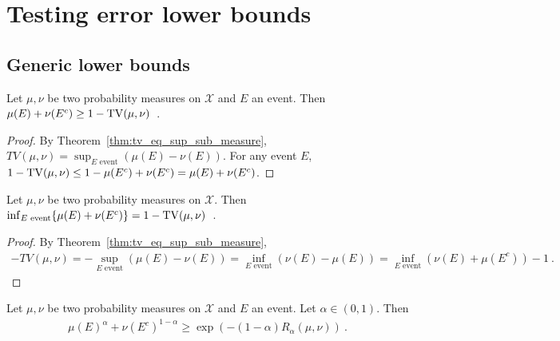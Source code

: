\chapter{Testing error lower bounds}

\section{Generic lower bounds}

\begin{lemma}
  \label{lem:testing_bound_tv}
  Let $\mu, \nu$ be two probability measures on $\mathcal X$ and $E$ an event. Then $\mu(E) + \nu(E^c) \ge 1 - \operatorname{TV}(\mu, \nu)$~.
\end{lemma}

\begin{proof}
By Theorem~\ref{thm:tv_eq_sup_sub_measure}, $TV(\mu, \nu) = \sup_{E \text{ event}} \left( \mu(E) - \nu(E) \right)$. For any event $E$, 
$1 - \operatorname{TV}(\mu, \nu) \le 1 - \mu(E^c) + \nu(E^c) = \mu(E) + \nu(E^c)$.
\end{proof}

\begin{theorem}
  \label{thm:testing_eq_tv}
  Let $\mu, \nu$ be two probability measures on $\mathcal X$. Then $\inf_{E \text{ event}}\{\mu(E) + \nu(E^c)\} = 1 - \operatorname{TV}(\mu, \nu)$~.
\end{theorem}

\begin{proof}
By Theorem~\ref{thm:tv_eq_sup_sub_measure},
\begin{align*}
-TV(\mu, \nu)
= -\sup_{E \text{ event}} \left( \mu(E) - \nu(E) \right)
=\inf_{E \text{ event}} \left(\nu(E) - \mu(E) \right)
= \inf_{E \text{ event}} \left( \nu(E) + \mu(E^c) \right) - 1
\: .
\end{align*}
\end{proof}

\begin{lemma}
  \label{lem:testing_bound_renyi_mean}
  Let $\mu, \nu$ be two probability measures on $\mathcal X$ and $E$ an event. Let $\alpha \in (0,1)$. Then
  \begin{align*}
  \mu(E)^\alpha + \nu(E^c)^{1 - \alpha}
  \ge \exp\left(-(1 - \alpha) R_{\alpha}(\mu, \nu)\right)
  \: .
  \end{align*}
\end{lemma}

